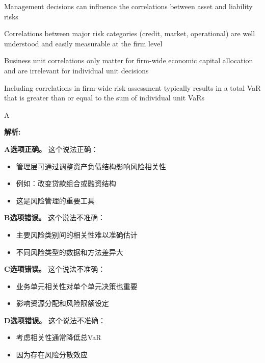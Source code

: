 \documentclass{article}
\newenvironment{explanation}
{\textbf{解析:}\par}
{\par}
\begin{document}
\begin{choices}
    \item Management decisions can influence the correlations between asset and liability risks
    \item Correlations between major risk categories (credit, market, operational) are well understood and easily measurable at the firm level
    \item Business unit correlations only matter for firm-wide economic capital allocation and are irrelevant for individual unit decisions
    \item Including correlations in firm-wide risk assessment typically results in a total VaR that is greater than or equal to the sum of individual unit VaRs
\end{choices}

\begin{correctanswer}
    A
\end{correctanswer}

\begin{explanation}
    \textbf{A选项正确。}
    这个说法正确：
    \begin{itemize}
        \item 管理层可通过调整资产负债结构影响风险相关性
        \item 例如：改变贷款组合或融资结构
        \item 这是风险管理的重要工具
    \end{itemize}

    \textbf{B选项错误。}
    这个说法不准确：
    \begin{itemize}
        \item 主要风险类别间的相关性难以准确估计
        \item 不同风险类型的数据和方法差异大
    \end{itemize}

    \textbf{C选项错误。}
    这个说法不准确：
    \begin{itemize}
        \item 业务单元相关性对单个单元决策也重要
        \item 影响资源分配和风险限额设定
    \end{itemize}

    \textbf{D选项错误。}
    这个说法不准确：
    \begin{itemize}
        \item 考虑相关性通常降低总VaR
        \item 因为存在风险分散效应
    \end{itemize}
\end{explanation}
\end{document}
